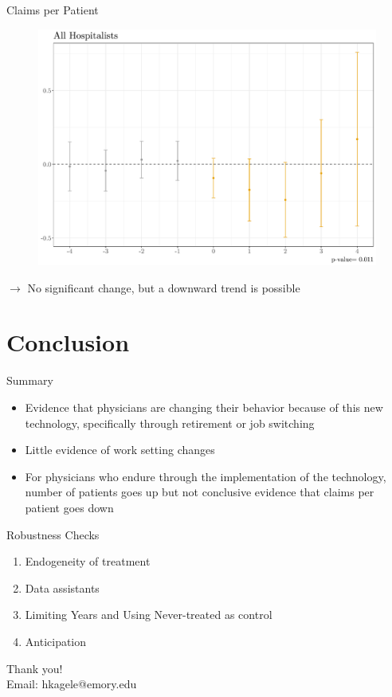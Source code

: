 \documentclass[10pt]{beamer}
\begin{document}
\begin{frame}{Claims per Patient}
\begin{figure}[ht]
    \centering
    \includegraphics[scale=.35]{Objects/Presentation_claimperpatient_all.pdf}
\end{figure}
$\rightarrow$ No significant change, but a downward trend is possible
\end{frame}





\section{Conclusion}


\begin{frame}{Summary}
\begin{itemize}
    \item Evidence that physicians are changing their behavior because of this new technology, specifically through retirement or job switching
    \vspace{3mm}
    \item Little evidence of work setting changes
    \vspace{3mm}
    \item For physicians who endure through the implementation of the technology, number of patients goes up but not conclusive evidence that claims per patient goes down
    
\end{itemize}
\end{frame}

\begin{frame}{Robustness Checks}
    \begin{enumerate}
        \item Endogeneity of treatment
        \item Data assistants
        \item Limiting Years and Using Never-treated as control
        \item Anticipation
    \end{enumerate}
\end{frame}








\begin{frame}[plain]{}
\centering
    Thank you! \\
    \vspace{5mm}
    Email: hkagele@emory.edu
\end{frame}
\end{document}
